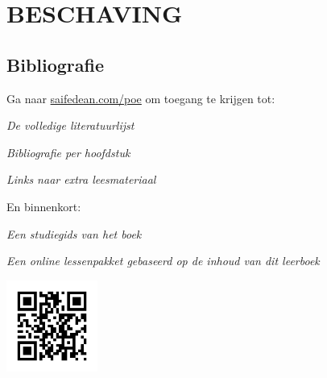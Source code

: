 \documentclass[smalldemyvopaper,11pt,twoside,onecolumn,openright,extrafontsizes]{memoir}
\makeatletter
\renewcommand\listoftables{%
        \@starttoc{lot}%
}
\renewcommand\listoffigures{%
        \@starttoc{lof}%
}
\makeatother
\begin{document}
\part{BESCHAVING}




\backmatter





\chapter{Bibliografie}
\begin{centering}
\noindent Ga naar \href{https://saifedean.com/poe}{saifedean.com/poe} om toegang te krijgen tot: \par
\vspace{1em}
\textit{De volledige literatuurlijst}\par
\vspace{1em}
\textit{Bibliografie per hoofdstuk}\par
\vspace{1em}
\textit{Links naar extra leesmateriaal}\par
\vspace{1em}
\noindent En binnenkort:\par
\vspace{1em}
\textit{Een studiegids van het boek}\par
\vspace{1em}
\textit{Een online lessenpakket gebaseerd op de inhoud van dit leerboek}\par
\end{centering}

\begin{center}
\includegraphics[width=3cm]{figures/saifedean_poe_qr_code.png}
\end{center}


\parfillskip=0pt
\printindex
\end{document}
